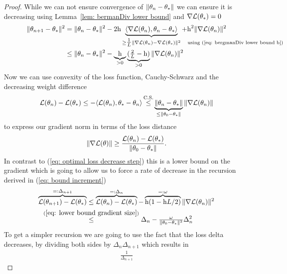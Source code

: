 \begin{proof}
	While we can not ensure convergence of \(\|\theta_n - \theta_*\|\) we can
	ensure it is decreasing using Lemma~\ref{lem: bermanDiv lower bound} and
	\(\nabla \mathcal{L}(\theta_*)=0\)
	\begin{align}
		\nonumber
		\|\weights_{n+1} - \minimum\|^2
		&= \|\weights_n - \minimum\|^2
		- 2\lr\underbrace{
			\langle \nabla\Loss(\weights_n), \weights_n - \minimum\rangle
		}_{
			\ge \tfrac{1}\ubound \|\nabla \Loss (\weights_n) - \nabla\Loss(\minimum)\|^2
			\mathrlap{\quad \text{using (\ref{eq: bergmanDiv lower bound b})}}
		} + \lr^2\|\nabla \Loss(\weights_n)\|^2
		\\
		&\le \|\weights_n - \minimum\|^2 - 
		\underbrace{\lr}_{>0}\underbrace{(\tfrac{2}{\ubound}-\lr)}_{>0}
		\|\nabla\Loss(\weights_n)\|^2
		\label{eq: decreasing weight difference}
	\end{align}
	Now we can use convexity of the loss function, Cauchy-Schwarz and the
	decreasing weight difference
	\begin{align*}
		\Loss(\weights_n)-\Loss(\minimum)
		\le -\langle \Loss(\weights_n), \minimum-\weights_n\rangle
		\xle{\text{C.S.}} \underbrace{\|\weights_n - \minimum\|}_{\le \|\weights_0 - \minimum\|}
		\|\nabla\Loss(\weights_n)\|
	\end{align*}
	to express our gradient norm in terms of the loss distance
	\begin{align}\label{eq: lower bound gradient size}
		\|\nabla\mathcal{L}(\theta)\|
		\ge \frac{\mathcal{L}(\theta_n)-\mathcal{L}(\theta_*)}{\|\theta_0-\theta_*\|}.
	\end{align}
	In contrast to (\ref{eq: optimal loss decrease step}) this is a lower bound
	on the gradient which is going to allow us to force a rate of decrease in
	the recursion derived in (\ref{eq: bound increment})
	\begin{align*}
		\overbrace{\Loss(\weights_{n+1}) - \Loss(\minimum)}^{=:\Delta_{n+1}}
		&\le \overbrace{\Loss(\weights_n)-\Loss(\minimum)}^{=:\Delta_n}
		- \overbrace{\lr(1-\lr\ubound/2)}^{=:\omega} \|\nabla \Loss(\weights_n)\|^2\\
		&\lxle{(\ref{eq: lower bound gradient size})} \Delta_n - \tfrac{\omega}{\|\weights_0-\minimum\|^2}\Delta_n^2
	\end{align*}
	To get a simpler recursion we are going to use the fact that the loss delta
	decreases, by dividing both sides by \(\Delta_n\Delta_{n+1}\) which results in
	\begin{align*}
		\frac{1}{\Delta_{n+1}}

\end{align*}
\end{proof}
